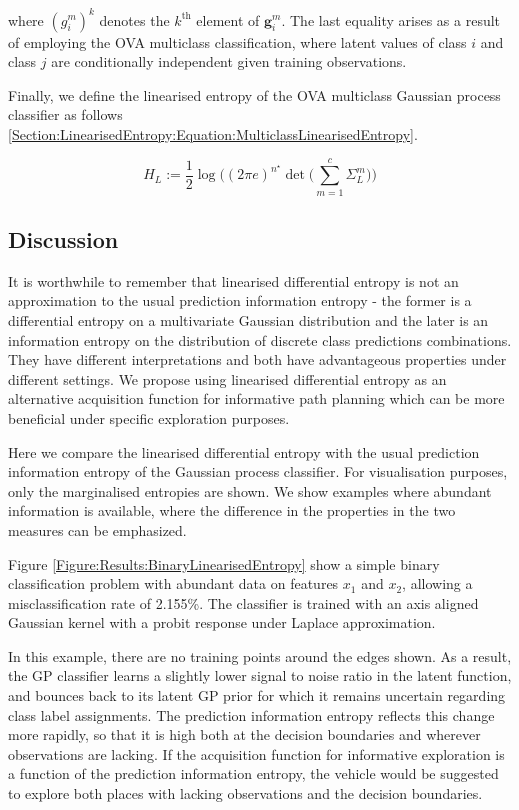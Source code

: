 \documentclass{article}
\renewcommand{\vec}[1]{\boldsymbol{#1}}
\begin{document}
			where $(g^{m}_{i})^{k}$ denotes the $k^{\text{th}}$ element of $\vec{g}^{m}_{i}$. The last equality arises as a result of employing the OVA multiclass classification, where latent values of class $i$ and class $j$ are conditionally independent given training observations.
			
			Finally, we define the linearised entropy of the OVA multiclass Gaussian process classifier as follows \eqref{Section:LinearisedEntropy:Equation:MulticlassLinearisedEntropy}.
			
			\begin{equation}
				H_{L} := \frac{1}{2} \log\Bigg((2 \pi e)^{n^{\star}} \det\bigg(\sum_{m = 1}^{c} \Sigma^{m}_{L}\bigg)\Bigg)
			\label{Section:LinearisedEntropy:Equation:MulticlassLinearisedEntropy}
			\end{equation}				
			
	\subsection{Discussion}
		
		It is worthwhile to remember that linearised differential entropy is not an approximation to the usual prediction information entropy - the former is a differential entropy on a multivariate Gaussian distribution and the later is an information entropy on the distribution of discrete class predictions combinations. They have different interpretations and both have advantageous properties under different settings. We propose using linearised differential entropy as an alternative acquisition function for informative path planning which can be more beneficial under specific exploration purposes.
		
		Here we compare the linearised differential entropy with the usual prediction information entropy of the Gaussian process classifier. For visualisation purposes, only the marginalised entropies are shown. We show examples where abundant information is available, where the difference in the properties in the two measures can be emphasized. 
		
		Figure \ref{Figure:Results:BinaryLinearisedEntropy} show a simple binary classification problem with abundant data on features $x_{1}$ and $x_{2}$, allowing a misclassification rate of 2.155\%. The classifier is trained with an axis aligned Gaussian kernel with a probit response under Laplace approximation. 

		In this example, there are no training points around the edges shown. As a result, the GP classifier learns a slightly lower signal to noise ratio in the latent function, and bounces back to its latent GP prior for which it remains uncertain regarding class label assignments. The prediction information entropy reflects this change more rapidly, so that it is high both at the decision boundaries and wherever observations are lacking. If the acquisition function for informative exploration is a function of the prediction information entropy, the vehicle would be suggested to explore both places with lacking observations and the decision boundaries. 
		
\end{document}
